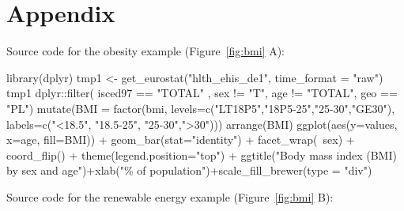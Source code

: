 \address{Przemyslaw Biecek\\
  Faculty of Mathematics, Informatics, and Mechanics\\
  University of Warsaw\\
  Banacha 2, 02-097 Warsaw\\
  Poland\\}

\newpage

\section{Appendix}

Source code for the obesity example (Figure~\ref{fig:bmi} A):

\begin{example}
library(dplyr)
tmp1 <- get_eurostat("hlth_ehis_de1", time_format = "raw")
tmp1 %
  dplyr::filter( isced97 == "TOTAL" ,
          sex != "T",
          age != "TOTAL", geo == "PL") %
  mutate(BMI = factor(bmi, 
                      levels=c("LT18P5","18P5-25","25-30","GE30"), 
                      labels=c("<18.5", "18.5-25", "25-30",">30"))) %
  arrange(BMI) %
  ggplot(aes(y=values, x=age, fill=BMI)) +
  geom_bar(stat="identity") +
  facet_wrap(~sex) + coord_flip() +
  theme(legend.position="top") + ggtitle("Body mass index (BMI) by sex and age")+xlab("\% of population")+scale_fill_brewer(type = "div")
\end{example}


Source code for the renewable energy example (Figure~\ref{fig:bmi} B):

